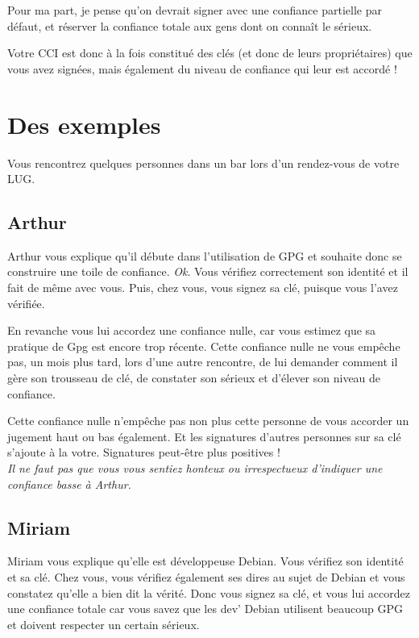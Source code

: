 Pour ma part, je pense qu'on devrait signer avec une confiance partielle
par défaut, et réserver la confiance totale aux gens dont on connaît le
sérieux.

Votre CCI est donc à la fois constitué des clés (et donc de leurs
propriétaires) que vous avez signées, mais également du niveau de
confiance qui leur est accordé !

\section{Des exemples}\label{des-exemples}

Vous rencontrez quelques personnes dans un bar lors d'un rendez-vous de
votre LUG.

\subsection{Arthur}\label{arthur}

Arthur vous explique qu'il débute dans l'utilisation de GPG et souhaite
donc se construire une toile de confiance. \emph{Ok}. Vous vérifiez
correctement son identité et il fait de même avec vous. Puis, chez vous,
vous signez sa clé, puisque vous l'avez vérifiée.

En revanche vous lui accordez une confiance nulle, car vous estimez que
sa pratique de Gpg est encore trop récente. Cette confiance nulle ne vous empêche pas, un mois plus tard, lors d'une
autre rencontre, de lui demander comment il gère son trousseau de clé,
de constater son sérieux et d'élever son niveau de confiance.

Cette confiance nulle n'empêche pas non plus cette personne de vous
accorder un jugement haut ou bas également. Et les signatures d'autres
personnes sur sa clé s'ajoute à la votre. Signatures peut-être plus
positives !\\

\emph{Il ne faut pas que vous vous sentiez honteux ou irrespectueux
d'indiquer une confiance basse à Arthur.}

\subsection{Miriam}\label{miriam}

Miriam vous explique qu'elle est développeuse Debian. Vous vérifiez son
identité et sa clé. Chez vous, vous vérifiez également ses dires au
sujet de Debian et vous constatez qu'elle a bien dit la vérité. Donc vous signez sa clé, et vous lui accordez une confiance totale car
vous savez que les dev' Debian utilisent beaucoup GPG et doivent
respecter un certain sérieux.

